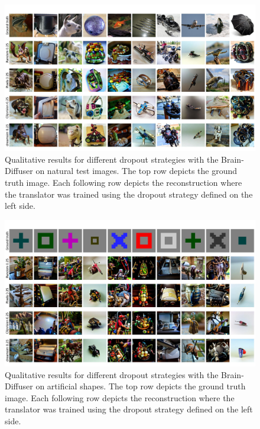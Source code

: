 \begin{figure}[H]
   \centering
   \includegraphics[width=1\textwidth]{plots/dropout_qual_eval_bd_test.JPEG}
   \caption[Experiment 1: Reconstructed images for Brain-Diffuser on natural test images]{Qualitative results for different dropout strategies with the Brain-Diffuser on natural test images. The top row depicts the ground truth image. Each following row depicts the reconstruction where the translator was trained using the dropout strategy defined on the left side.}\label{fig:dropout_qual_eval_bd_test}
\end{figure}

\begin{figure}[H]
   \centering
   \includegraphics[width=1\textwidth]{plots/dropout_qual_eval_bd_art.JPEG}
   \caption[Experiment 1: Reconstructed images for Brain-Diffuser on artificial shapes]{Qualitative results for different dropout strategies with the Brain-Diffuser on artificial shapes. The top row depicts the ground truth image. Each following row depicts the reconstruction where the translator was trained using the dropout strategy defined on the left side.}\label{fig:dropout_qual_eval_bd_art}
\end{figure}



